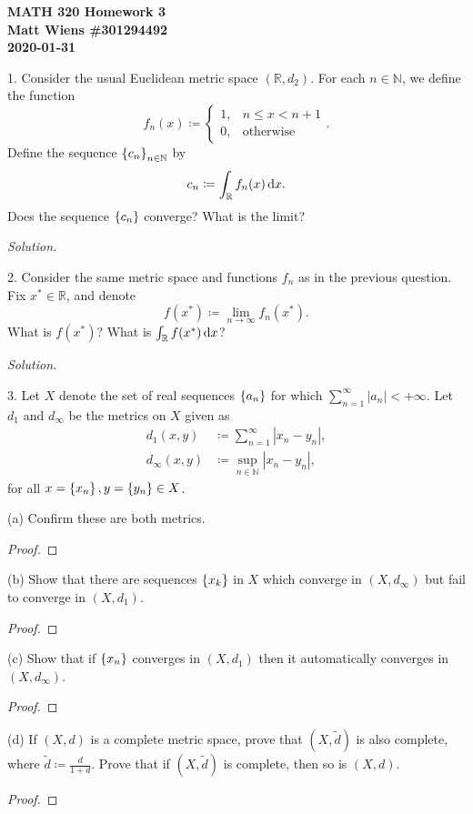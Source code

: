 \documentclass{article}
\newcommand{\N}{\mathbb{N}}
\newcommand{\R}{\mathbb{R}}
\begin{document}
\textbf{MATH 320 Homework 3} \\
\textbf{Matt Wiens \#301294492} \\
\textbf{2020-01-31}

1. Consider the usual Euclidean metric space $(\R, d_2)$. For each $n
   \in \N$, we define the function
%
\begin{equation*}
    f_n(x) \coloneqq
        \begin{cases}
            1 ,& n \leq x < n + 1 \\
            0 ,& \text{otherwise}
        \end{cases}
    .
\end{equation*}
%
Define the sequence $\cbr{c_n}_{n \in \N}$ by
%
\begin{equation*}
    c_n \coloneqq \int_{\R} f_n(x) \dif x
    .
\end{equation*}
%
Does the sequence $\cbr{c_n}$ converge? What is the limit?

\textit{Solution.}

\newpage

2. Consider the same metric space and functions $f_n$ as in the previous
   question. Fix $x^* \in \R$, and denote
%
\begin{equation*}
    f(x^*) \coloneqq \lim_{n \to \infty} f_n(x^*)
    .
\end{equation*}
%
What is $f(x^*)$? What is $\int_{\R} f(x^*) \dif x$?

\textit{Solution.}

\newpage

3. Let $X$ denote the set of real sequences $\cbr{a_n}$ for which
   $\sum_{n = 1}^\infty |a_n| < +\infty$. Let $d_1$ and $d_{\infty}$ be
   the metrics on $X$ given as
%
\begin{align*}
    d_1(x,y) &\coloneqq \sum_{n = 1}^\infty |x_n-y_n|, \\
    d_{\infty}(x,y) &\coloneqq \sup_{n \in \N} |x_n - y_n|,
\end{align*}
%
for all $x = \cbr{x_n}, y = \cbr{y_n} \in X$.

(a) Confirm these are both metrics.

\begin{proof}
\end{proof}

(b) Show that there are sequences $\cbr{x_k}$ in $X$ which converge in
$(X, d_{\infty})$ but fail to converge in $(X, d_1)$.

\begin{proof}
\end{proof}

(c) Show that if $\cbr{x_n}$ converges in $(X, d_1)$ then it
automatically converges in $(X, d_{\infty})$.

\begin{proof}
\end{proof}

(d) If $(X, d)$ is a complete metric space, prove that $(X, \tilde{d})$
is also complete, where $\tilde{d} \coloneqq \frac{d}{1 + d}$. Prove
that if $(X, \tilde{d})$ is complete, then so is $(X, d)$.

\begin{proof}
\end{proof}
\end{document}
